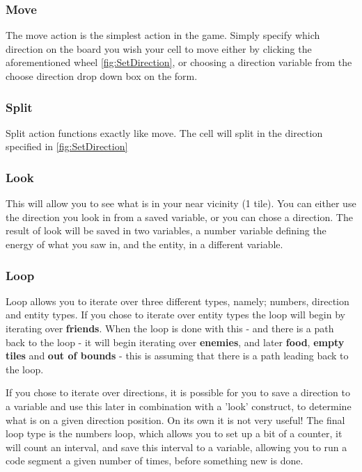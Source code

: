 \subsubsection{Move}

The move action is the simplest action in the game. Simply specify which direction on the board you wish your cell to move either by clicking the aforementioned wheel \ref{fig:SetDirection}, or choosing a direction variable from the choose direction drop down box on the form.

\subsubsection{Split}

Split action functions exactly like move. The cell will split in the direction specified in \ref{fig:SetDirection}

\subsubsection{Look}

This will allow you to see what is in your near vicinity (1 tile). You can either use the direction you look in from a saved variable, or you can chose a direction. The result of look will be saved in two variables, a number variable defining the energy of what you saw in, and the entity, in a different variable.

\subsubsection{Loop}

Loop allows you to iterate over three different types, namely; numbers, direction and entity types. If you chose to iterate over entity types the loop will begin by iterating over \textbf{friends}. When the loop is done with this - and there is a path back to the loop - it will begin iterating over \textbf{enemies}, and later \textbf{food}, \textbf{empty tiles} and \textbf{out of bounds} - this is assuming that there is a path leading back to the loop.


If you chose to iterate over directions, it is possible for you to save a direction to a variable and use this later in combination with a 'look' construct, to determine what is on a given direction position. On its own it is not very useful! The final loop type is the numbers loop, which allows you to set up a bit of a counter, it will count an interval, and save this interval to a variable, allowing you to run a code segment a given number of times, before something new is done.

